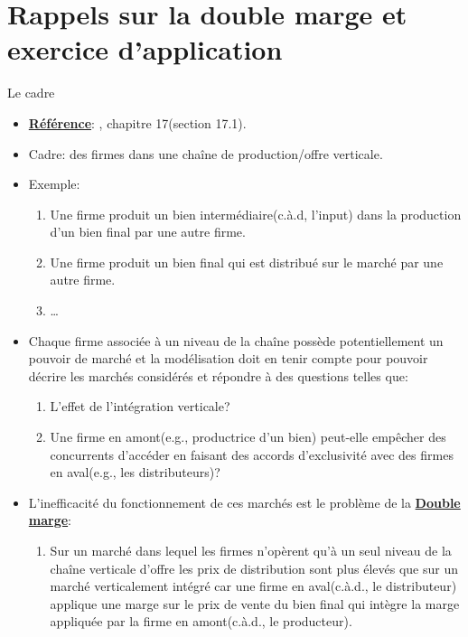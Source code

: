 \section{Rappels sur la double marge et exercice d'application}
\frame{\sectionpage}
\begin{frame}[allowframebreaks]{Le cadre}
\begin{itemize}
\item \textbf{\underline{Référence}}: \cite{belleflamme_peitz_2015}, chapitre 17(section 17.1).
\item Cadre: des firmes dans une chaîne de production/offre verticale. 
\item Exemple:
\begin{enumerate}[$\star$]
    \item Une firme produit un bien intermédiaire(c.à.d, l'input) dans la production d'un bien final 
    par une autre firme. 
    \item Une firme produit un bien final qui est distribué sur le marché par une autre firme. 
    \item \ldots
\end{enumerate} 
\item Chaque firme associée à un niveau de la chaîne possède potentiellement un pouvoir de marché 
et la modélisation doit en tenir compte pour pouvoir décrire les marchés considérés et répondre à des questions telles que: 
\begin{enumerate}[$\star$]
\item L'effet de l'intégration verticale?
\item Une firme en amont(e.g., productrice d'un bien) peut-elle empêcher des concurrents 
d'accéder en faisant des accords d'exclusivité avec des firmes en aval(e.g., les distributeurs)?
\end{enumerate} 

\framebreak

\item L'inefficacité du fonctionnement de ces marchés est le problème de la  \textbf{\underline{Double marge}}:
\begin{enumerate}[$\star$]
\item Sur un marché dans lequel les firmes n'opèrent qu'à un seul niveau de la chaîne verticale d'offre 
les prix de distribution sont plus élevés que sur un marché verticalement intégré car une firme 
en aval(c.à.d., le distributeur) applique une marge sur le prix de vente du bien final qui intègre la marge appliquée 
par la firme en amont(c.à.d., le producteur).
\end{enumerate}
\end{itemize}
\end{frame}
